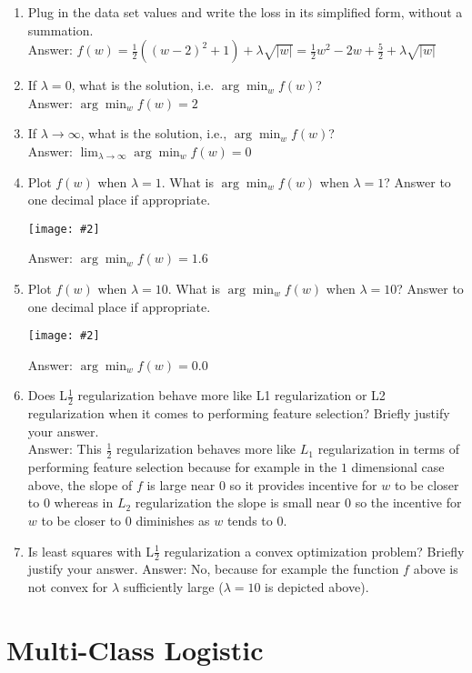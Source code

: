 \documentclass{article}
\def\gre#1{{\color{gre}#1}}
\def\ans#1{\gre{Answer: #1}}{}
\newcommand{\centerfig}[2]{\begin{center}\texttt{[image: \#2]}\end{center}}
\begin{document}
\begin{enumerate}
\item Plug in the data set values and write the loss in its simplified form, without a summation. \\
\ans{$f(w) = \frac{1}{2}((w - 2)^2 + 1) + \lambda \sqrt{|w|} = \frac{1}{2}w^2 - 2w + \frac{5}{2} + \lambda \sqrt{|w|}$}
\item If $\lambda=0$, what is the solution, i.e. $\arg \min_w f(w)$? \\
\ans{$\arg \min_w f(w) = 2$}
\item If $\lambda\rightarrow \infty$, what is the solution, i.e., $\arg \min_w f(w)$? \\
\ans{$\lim_{\lambda \to \infty} \arg \min_w f(w) = 0$}
\item Plot $f(w)$ when $\lambda = 1$. What is $\arg \min_w f(w)$ when $\lambda=1$? Answer to one decimal place if appropriate.

\centerfig{.5}{../figs/q2_6_lambda_1.pdf}
\ans{$\arg \min_w f(w) = 1.6$}

\item Plot $f(w)$ when $\lambda = 10$. What is $\arg \min_w f(w)$ when $\lambda=10$? Answer to one decimal place if appropriate.
\centerfig{.5}{../figs/q2_6_lambda_10.pdf}
\ans{$\arg \min_w f(w) = 0.0$}

\item Does L$\frac12$ regularization behave more like L1 regularization or L2 regularization
when it comes to performing feature selection? Briefly justify your answer. \\
\ans{This $\frac{1}{2}$ regularization behaves more like $L_1$ regularization in terms of performing feature selection because for example in the $1$ dimensional case above, the slope of $f$ is large near $0$ so it provides incentive for $w$ to be closer to $0$ whereas in $L_2$ regularization the slope is small near $0$ so the incentive for $w$ to be closer to $0$ diminishes as $w$ tends to $0$.}
\item Is least squares with L$\frac12$ regularization 
a convex optimization problem? Briefly justify your answer.
\ans{No, because for example the function $f$ above is not convex for $\lambda$ sufficiently large ($\lambda = 10$ is depicted above).
}
\end{enumerate}




\section{Multi-Class Logistic}
\end{document}
